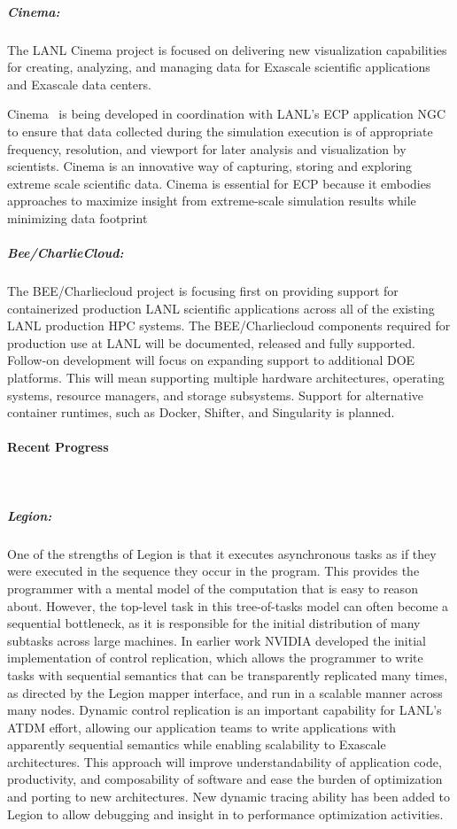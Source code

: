 \subparagraph{Cinema:}
The LANL Cinema project is focused on delivering new
visualization capabilities for creating, analyzing, and managing data for
Exascale scientific applications and Exascale data centers.

Cinema~\cite{cinema:Ahrens:SC14} is being developed in coordination with
LANL's ECP application NGC to ensure that data collected during the simulation
execution is of appropriate frequency, resolution, and viewport for later
analysis and visualization by scientists. Cinema is an innovative way of
capturing, storing and exploring extreme scale scientific data. Cinema is
essential for ECP because it embodies approaches to maximize insight from
extreme-scale simulation results while minimizing data footprint 

\subparagraph{Bee/CharlieCloud:}
The BEE/Charliecloud project is focusing first on providing support for
containerized production LANL scientific applications across all of the
existing LANL production HPC systems.  The BEE/Charliecloud components required
for production use at LANL will be documented, released and fully supported.
Follow-on development will focus on expanding support to additional DOE
platforms.  This will mean supporting multiple hardware architectures,
operating systems, resource managers, and storage subsystems.  Support for
alternative container runtimes, such as Docker, Shifter, and Singularity is
planned.

\paragraph{Recent Progress} \leavevmode \\

\subparagraph{Legion:} 
One of the strengths of Legion is that it executes asynchronous tasks as if they were executed in the sequence they occur in the program. This provides the programmer with a mental model of the computation that is easy to reason about. However, the top-level task in this tree-of-tasks model can often become a sequential bottleneck, as it is responsible for the initial distribution of many subtasks across large machines. In earlier work NVIDIA developed the initial implementation of control replication, which allows the programmer to write tasks with sequential semantics that can be  transparently replicated many times, as directed by the Legion mapper interface, and run in a scalable manner across many nodes.
Dynamic control replication is an important capability for LANL's ATDM effort, allowing our application teams to write applications with apparently sequential semantics while enabling scalability to Exascale architectures. This approach will improve understandability of application code, productivity, and composability of software and ease the burden of optimization and porting to new architectures. 
New dynamic tracing ability has been added to Legion to allow debugging and insight in to performance optimization activities.

